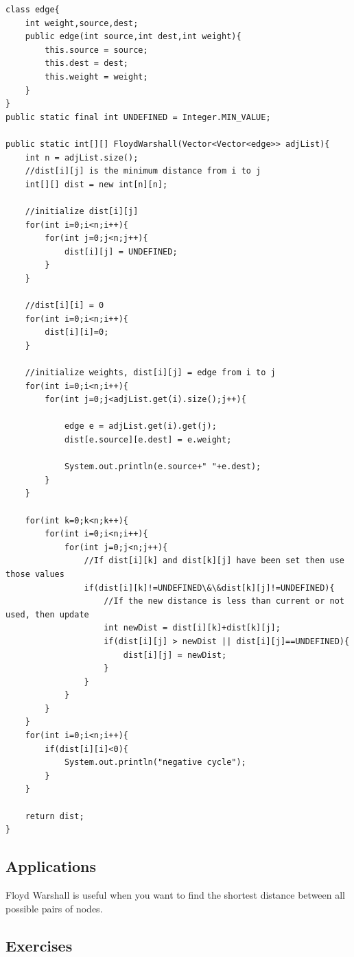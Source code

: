 \documentclass[11pt,oneside]{book}
\begin{document}
\begin{lstlisting}
class edge{
    int weight,source,dest;
    public edge(int source,int dest,int weight){
        this.source = source;
        this.dest = dest;
        this.weight = weight;
    }
}
public static final int UNDEFINED = Integer.MIN_VALUE;
    
public static int[][] FloydWarshall(Vector<Vector<edge>> adjList){
    int n = adjList.size();
    //dist[i][j] is the minimum distance from i to j
    int[][] dist = new int[n][n];
    
    //initialize dist[i][j]
    for(int i=0;i<n;i++){
        for(int j=0;j<n;j++){
            dist[i][j] = UNDEFINED;
        }
    }
    
    //dist[i][i] = 0
    for(int i=0;i<n;i++){
        dist[i][i]=0;
    }
    
    //initialize weights, dist[i][j] = edge from i to j
    for(int i=0;i<n;i++){
        for(int j=0;j<adjList.get(i).size();j++){
            
            edge e = adjList.get(i).get(j);
            dist[e.source][e.dest] = e.weight;
            
            System.out.println(e.source+" "+e.dest);
        }
    }
    
    for(int k=0;k<n;k++){
        for(int i=0;i<n;i++){
            for(int j=0;j<n;j++){
                //If dist[i][k] and dist[k][j] have been set then use those values
                if(dist[i][k]!=UNDEFINED\&\&dist[k][j]!=UNDEFINED){
                    //If the new distance is less than current or not used, then update
                    int newDist = dist[i][k]+dist[k][j];
                    if(dist[i][j] > newDist || dist[i][j]==UNDEFINED){
                        dist[i][j] = newDist;
                    }
                }
            }
        }
    }
    for(int i=0;i<n;i++){
        if(dist[i][i]<0){
            System.out.println("negative cycle");
        }
    }
    
    return dist;
}
\end{lstlisting}

\subsection{Applications}

Floyd Warshall is useful when you want to find the shortest distance between all possible pairs of nodes.

\subsection{Exercises}
\end{document}

